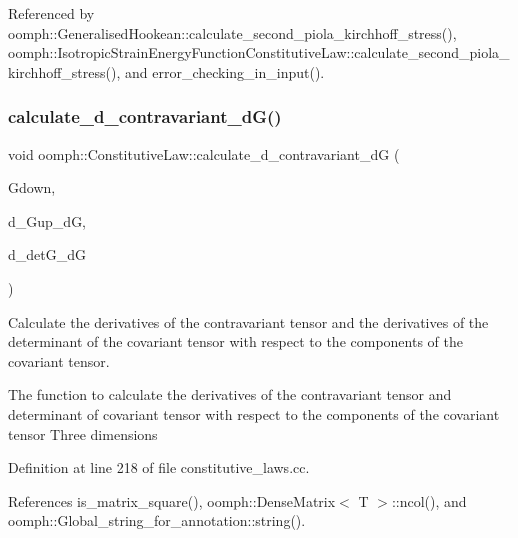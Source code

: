Referenced by oomph\+::\+Generalised\+Hookean\+::calculate\+\_\+second\+\_\+piola\+\_\+kirchhoff\+\_\+stress(), oomph\+::\+Isotropic\+Strain\+Energy\+Function\+Constitutive\+Law\+::calculate\+\_\+second\+\_\+piola\+\_\+kirchhoff\+\_\+stress(), and error\+\_\+checking\+\_\+in\+\_\+input().

\mbox{\label{classoomph_1_1ConstitutiveLaw_a6dda64e60ed8128cb4603041dc66036f}} 
\subsubsection{\texorpdfstring{calculate\+\_\+d\+\_\+contravariant\+\_\+d\+G()}{calculate\_d\_contravariant\_dG()}}
{\footnotesize\ttfamily void oomph\+::\+Constitutive\+Law\+::calculate\+\_\+d\+\_\+contravariant\+\_\+dG (\begin{DoxyParamCaption}\item[{const \hyperlink{classoomph_1_1DenseMatrix}{Dense\+Matrix}$<$ double $>$ \&}]{Gdown,  }\item[{\hyperlink{classoomph_1_1RankFourTensor}{Rank\+Four\+Tensor}$<$ double $>$ \&}]{d\+\_\+\+Gup\+\_\+dG,  }\item[{\hyperlink{classoomph_1_1DenseMatrix}{Dense\+Matrix}$<$ double $>$ \&}]{d\+\_\+det\+G\+\_\+dG }\end{DoxyParamCaption})\hspace{0.3cm}{\ttfamily [protected]}}



Calculate the derivatives of the contravariant tensor and the derivatives of the determinant of the covariant tensor with respect to the components of the covariant tensor. 

The function to calculate the derivatives of the contravariant tensor and determinant of covariant tensor with respect to the components of the covariant tensor Three dimensions 

Definition at line 218 of file constitutive\+\_\+laws.\+cc.



References is\+\_\+matrix\+\_\+square(), oomph\+::\+Dense\+Matrix$<$ T $>$\+::ncol(), and oomph\+::\+Global\+\_\+string\+\_\+for\+\_\+annotation\+::string().



